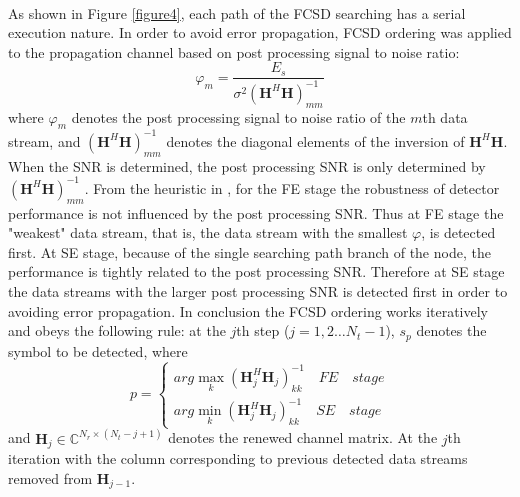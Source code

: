 \documentclass[12pt,a4paper,final]{article}
\begin{document}
\begin{spacing}{2.5}
\paragraph{}As shown in Figure \ref{figure4}, each path of the FCSD searching has a serial execution nature. In order to avoid error propagation, FCSD ordering was applied to the propagation channel based on post processing signal to noise ratio\cite{wolniansky1998v}:
\begin{equation}
\varphi_{m}=\frac{E_{s}}{\sigma^{2}(\mathbf{H}^{H}\mathbf{H})_{mm}^{-1}}  \label{ppsnr}
\end{equation}
where $\varphi_{m}$ denotes the post processing signal to noise ratio of the $m$th data stream, and $(\mathbf{H}^{H}\mathbf{H})_{mm}^{-1}$ denotes the diagonal elements of the inversion of $\mathbf{H}^{H}\mathbf{H}$. When the SNR is determined, the post processing SNR is only determined by $(\mathbf{H}^{H}\mathbf{H})_{mm}^{-1}$. From the heuristic in \cite{barbero2008fixing},  for the FE stage the robustness of detector performance is not influenced by the post processing SNR. Thus at FE stage the "weakest" data stream, that is, the data stream with the smallest $\varphi$, is detected first. At SE stage, because of the single searching path branch of the node, the performance is tightly related to the post processing SNR. Therefore at SE stage the data streams with the larger post processing SNR is detected first in order to avoiding error propagation. In conclusion the FCSD ordering works iteratively  and obeys the following rule:
at the $j$th step ($j=1,2\dots N_{t}-1$), $s_{p}$ denotes the symbol to be detected, where 
\begin{displaymath}
p=\left\lbrace \begin{array}{c}
arg \max_{k}(\mathbf{H}_{j}^{H}\mathbf{H}_{j})_{kk}^{-1}\quad FE\quad stage\\
arg \min_{k}(\mathbf{H}_{j}^{H}\mathbf{H}_{j})_{kk}^{-1}\quad SE\quad stage   \label{the ordering}
\end{array}\right.  
\end{displaymath}  
and $\mathbf{H}_{j}\in \mathbb{C}^{N_{r}\times (N_{t}-j+1)}$ denotes the renewed channel matrix. At the $j$th iteration with the column corresponding to previous detected data streams removed from $\mathbf{H}_{j-1}$.



\end{spacing}
\end{document}
